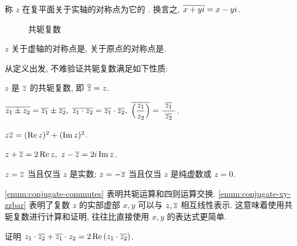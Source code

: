 \begin{definition}
  称 $z$ 在复平面关于实轴的对称点为它的 .
  换言之, $\overline{x+yi}=x-yi$.
\end{definition}


\begin{figure}[!ht]
  \centering
  \caption{共轭复数}
\end{figure}

\begin{exercise}
  $z$ 关于虚轴的对称点是\fillblank{}, 关于原点的对称点是\fillblank{}.
\end{exercise}

从定义出发, 不难验证共轭复数满足如下性质:
\begin{enumpar}
  \item $z$ 是 $\overline z$ 的共轭复数, 即 $\overline{\overline z}=z$.
  \label{enum:conjugate-zbarbar}
  \item $\ov{z_1\pm z_2}=\ov{z_1}\pm\ov{z_2},\ 
  \ov{z_1\cdot z_2}=\ov{z_1}\cdot\ov{z_2},\ 
  \ov{\Bigl(\dfrac{z_1}{z_2}\Bigr)}=\dfrac{~\ov{z_1}~}{~\ov{z_2}~}$.
  \label{enum:conjugate-commutes}
  \item $z\overline{z}=(\operatorname{Re} z)^2+(\operatorname{Im} z)^2$.
  \item $z+\overline z=2\operatorname{Re} z,\ z-\overline z=2i\operatorname{Im} z$.
  \label{enum:conjugate-xy-zzbar}
  \item $z=\overline z$ 当且仅当 $z$ 是实数; $z=-\overline z$ 当且仅当 $z$ 是纯虚数或 $z=0$.
  \label{enum:conjugate-real-imag}
\end{enumpar}\par\noindent
 \ref{enum:conjugate-commutes} 表明共轭运算和四则运算交换.
 \ref{enum:conjugate-xy-zzbar} 表明了复数 $z$ 的实部虚部 $x,y$ 可以与 $z,\overline z$ 相互线性表示.
这意味着使用共轭复数进行计算和证明, 往往比直接使用 $x,y$ 的表达式更简单.

\begin{example}
  证明 $z_1\cdot\overline{z_2}+\overline{z_1}\cdot z_2=2\operatorname{Re}{(z_1\cdot\overline{z_2})}$.
\end{example}

